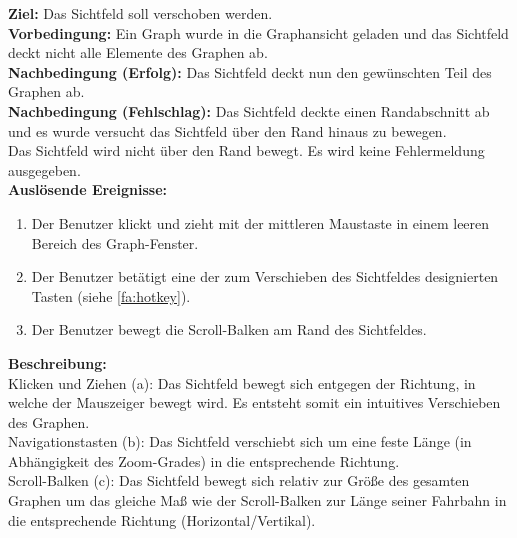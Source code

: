 \label{fa:verschieben}
\textbf{Ziel:} Das Sichtfeld soll verschoben werden.\\
\textbf{Vorbedingung:} Ein Graph wurde in die Graphansicht geladen und das Sichtfeld deckt nicht alle Elemente des Graphen ab.\\
\textbf{Nachbedingung (Erfolg):}  Das Sichtfeld deckt nun den gewünschten Teil des Graphen ab.\\
\textbf{Nachbedingung (Fehlschlag):} Das Sichtfeld deckte einen Randabschnitt ab und es wurde versucht das Sichtfeld über den Rand hinaus zu bewegen.\\
Das Sichtfeld wird nicht über den Rand bewegt. Es wird keine Fehlermeldung ausgegeben.\\
\textbf{Auslösende Ereignisse:}
\begin{enumerate}[nolistsep, label=(\alph*)]
  \item Der Benutzer klickt und zieht mit der mittleren Maustaste in einem leeren Bereich des Graph-Fenster.
  \item Der Benutzer betätigt eine der zum Verschieben des Sichtfeldes designierten Tasten (siehe \ref{fa:hotkey}).
  \item Der Benutzer bewegt die Scroll-Balken am Rand des Sichtfeldes. %
\end{enumerate}
\textbf{Beschreibung:}\\
Klicken und Ziehen (a): Das Sichtfeld bewegt sich entgegen der Richtung, in welche der Mauszeiger bewegt wird. Es entsteht somit ein intuitives Verschieben des Graphen.\\
Navigationstasten (b): Das Sichtfeld verschiebt sich um eine feste Länge (in Abhängigkeit des Zoom-Grades) in die entsprechende Richtung.\\
Scroll-Balken (c): Das Sichtfeld bewegt sich relativ zur Größe des gesamten Graphen um das gleiche Maß wie der Scroll-Balken zur Länge seiner Fahrbahn in die entsprechende Richtung (Horizontal/Vertikal).\\

